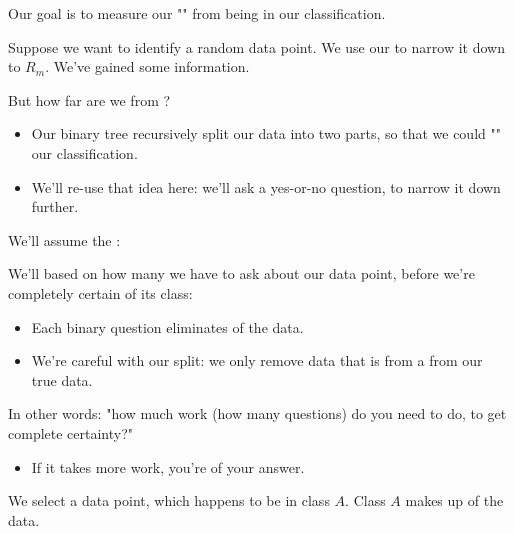        \begin{concept}
            Our goal is to measure our "" from being  in our classification.
        \end{concept}

        Suppose we want to identify a random data point. We use our  to narrow it down to $R_m$. We've gained some information. 

        But how far are we from ?


        \begin{itemize}
            \item Our binary tree recursively split our data into two parts, so that we could "" our classification. 

            \item We'll re-use that idea here: we'll ask a  yes-or-no question, to narrow it down further. 
        \end{itemize}
        
        
        We'll assume the :\\

        \begin{concept}
            We'll  based on how many  we have to ask about our data point, before we're completely certain of its class:

            \begin{itemize}
                \item Each binary question eliminates  of the data.
                \item We're careful with our split: we only remove data that is from a  from our true data.
            \end{itemize}

            In other words: "how much work (how many questions) do you need to do, to get complete certainty?"

            \begin{itemize}
                \item If it takes more work, you're  of your answer.
            \end{itemize}
        \end{concept}

        \miniex We select a data point, which happens to be in class $A$. Class $A$ makes up  of the data.

